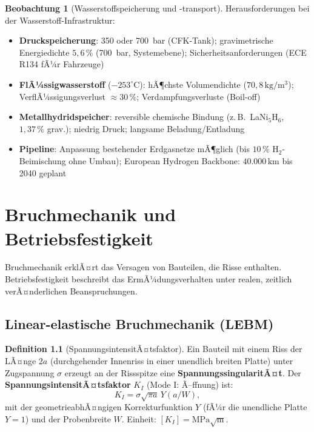 ﻿\documentclass[a4paper,12pt]{report}
\theoremstyle{definition}
\newtheorem{definition}{Definition}
\newtheorem{beobachtung}{Beobachtung}
\begin{document}
\begin{beobachtung}[Wasserstoffspeicherung und -transport]
Herausforderungen bei der Wasserstoff-Infrastruktur:
\begin{itemize}
    \item[-] \textbf{Druckspeicherung}: 350 oder 700~bar (CFK-Tank); gravimetrische
          Energiedichte $5{,}6\,\%$ (700~bar, Systemebene); Sicherheitsanforderungen
          (ECE R134 fÃ¼r Fahrzeuge)
    \item[-] \textbf{FlÃ¼ssigwasserstoff} ($-253^\circ\mathrm{C}$): hÃ¶chste Volumendichte
          ($70{,}8\,\mathrm{kg/m^3}$); VerflÃ¼ssigungsverlust $\approx 30\,\%$;
          Verdampfungsverluste (Boil-off)
    \item[-] \textbf{Metallhydridspeicher}: reversible chemische Bindung
          (z.\,B.\ LaNi$_5$H$_6$, $1{,}37\,\%$ grav.); niedrig Druck; langsame
          Beladung/Entladung
    \item[-] \textbf{Pipeline}: Anpassung bestehender Erdgasnetze mÃ¶glich
          (bis $10\,\%$ H$_2$-Beimischung ohne Umbau);
          European Hydrogen Backbone: $40.000\,\mathrm{km}$ bis 2040 geplant
\end{itemize}
\end{beobachtung}

\chapter{Bruchmechanik und Betriebsfestigkeit}

Bruchmechanik erklÃ¤rt das Versagen von Bauteilen, die Risse enthalten.
Betriebsfestigkeit beschreibt das ErmÃ¼dungsverhalten unter realen,
zeitlich verÃ¤nderlichen Beanspruchungen.

\section{Linear-elastische Bruchmechanik (LEBM)}

\begin{definition}[SpannungsintensitÃ¤tsfaktor]
Ein Bauteil mit einem Riss der LÃ¤nge $2a$ (durchgehender Innenriss
in einer unendlich breiten Platte) unter Zugspannung $\sigma$ erzeugt
an der Rissspitze eine \textbf{SpannungssingularitÃ¤t}.
Der \textbf{SpannungsintensitÃ¤tsfaktor} $K_I$ (Mode I: Ã–ffnung) ist:
\[
  K_I = \sigma\sqrt{\pi a}\,Y(a/W),
\]
mit der geometrieabhÃ¤ngigen Korrekturfunktion $Y$ (fÃ¼r die unendliche
Platte $Y = 1$) und der Probenbreite $W$.
Einheit: $[K_I] = \mathrm{MPa\sqrt{m}}$.
\end{definition}
\end{document}
